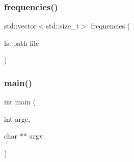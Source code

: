\subsubsection{\texorpdfstring{frequencies()}{frequencies()}}
{\footnotesize\ttfamily std\+::vector$<$std\+::size\+\_\+t$>$ frequencies (\begin{DoxyParamCaption}\item[{fs\+::path}]{file }\end{DoxyParamCaption})}

\mbox{\label{irk-compress_8cpp_a3c04138a5bfe5d72780bb7e82a18e627}} 
\subsubsection{\texorpdfstring{main()}{main()}}
{\footnotesize\ttfamily int main (\begin{DoxyParamCaption}\item[{int}]{argc,  }\item[{char $\ast$$\ast$}]{argv }\end{DoxyParamCaption})}

